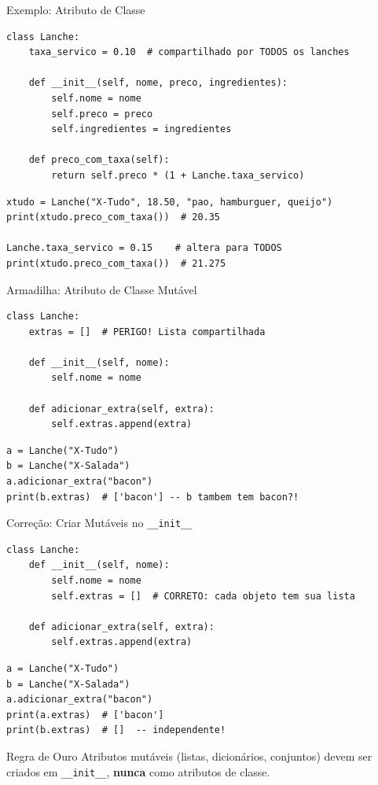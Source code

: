 \documentclass[aspectratio=169]{beamer}
\begin{document}
\begin{frame}[fragile]{Exemplo: Atributo de Classe}
  \begin{lstlisting}
class Lanche:
    taxa_servico = 0.10  # compartilhado por TODOS os lanches

    def __init__(self, nome, preco, ingredientes):
        self.nome = nome
        self.preco = preco
        self.ingredientes = ingredientes

    def preco_com_taxa(self):
        return self.preco * (1 + Lanche.taxa_servico)
  \end{lstlisting}

  \begin{lstlisting}
xtudo = Lanche("X-Tudo", 18.50, "pao, hamburguer, queijo")
print(xtudo.preco_com_taxa())  # 20.35

Lanche.taxa_servico = 0.15    # altera para TODOS
print(xtudo.preco_com_taxa())  # 21.275
  \end{lstlisting}
\end{frame}

\begin{frame}[fragile]{Armadilha: Atributo de Classe Mutável}
  \begin{lstlisting}
class Lanche:
    extras = []  # PERIGO! Lista compartilhada

    def __init__(self, nome):
        self.nome = nome

    def adicionar_extra(self, extra):
        self.extras.append(extra)
  \end{lstlisting}

  \begin{lstlisting}
a = Lanche("X-Tudo")
b = Lanche("X-Salada")
a.adicionar_extra("bacon")
print(b.extras)  # ['bacon'] -- b tambem tem bacon?!
  \end{lstlisting}
\end{frame}

\begin{frame}[fragile,shrink=10]{Correção: Criar Mutáveis no \texttt{\_\_init\_\_}}
  \begin{lstlisting}
class Lanche:
    def __init__(self, nome):
        self.nome = nome
        self.extras = []  # CORRETO: cada objeto tem sua lista

    def adicionar_extra(self, extra):
        self.extras.append(extra)
  \end{lstlisting}

  \begin{lstlisting}
a = Lanche("X-Tudo")
b = Lanche("X-Salada")
a.adicionar_extra("bacon")
print(a.extras)  # ['bacon']
print(b.extras)  # []  -- independente!
  \end{lstlisting}

  \begin{alertblock}{Regra de Ouro}
    Atributos mutáveis (listas, dicionários, conjuntos) devem ser
    criados em \texttt{\_\_init\_\_}, \textbf{nunca} como atributos de classe.
  \end{alertblock}
\end{frame}
\end{document}
